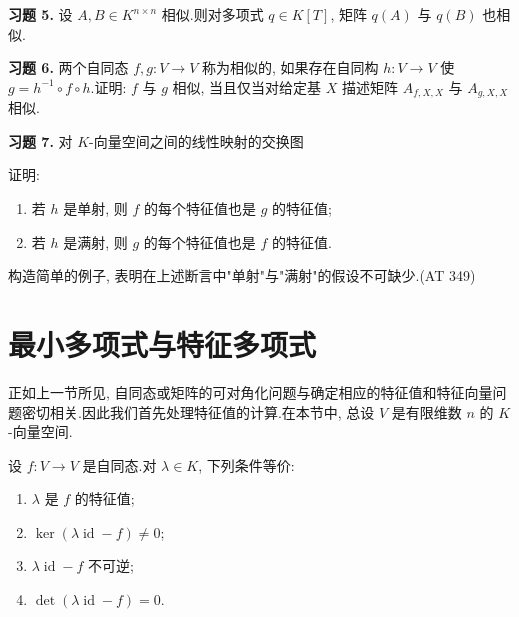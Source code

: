 \medskip
\noindent\textbf{习题 5.} 设 $A, B \in K^{n \times n}$ 相似.则对多项式 $q \in K[T]$, 矩阵 $q(A)$ 与 $q(B)$ 也相似.

\medskip
\noindent\textbf{习题 6.} 两个自同态 $f, g \colon V \longrightarrow V$ 称为相似的, 如果存在自同构 $h \colon V \longrightarrow V$ 使 $g = h^{-1} \circ f \circ h$.证明: $f$ 与 $g$ 相似, 当且仅当对给定基 $X$ 描述矩阵 $A_{f, X, X}$ 与 $A_{g, X, X}$ 相似.

\medskip
\noindent\textbf{习题 7.} 对 $K$-向量空间之间的线性映射的交换图

\begin{center}
\end{center}

证明:
\begin{enumerate}
\item[(i)] 若 $h$ 是单射, 则 $f$ 的每个特征值也是 $g$ 的特征值;
\item[(ii)] 若 $h$ 是满射, 则 $g$ 的每个特征值也是 $f$ 的特征值.
\end{enumerate}

构造简单的例子, 表明在上述断言中"单射"与"满射"的假设不可缺少.(AT 349)

\section{最小多项式与特征多项式}\label{sec:6.2}

正如上一节所见, 自同态或矩阵的可对角化问题与确定相应的特征值和特征向量问题密切相关.因此我们首先处理特征值的计算.在本节中, 总设 $V$ 是有限维数 $n$ 的 $K$-向量空间.

\begin{theorem}\label{thm:6.2.1}
设 $f \colon V \longrightarrow V$ 是自同态.对 $\lambda \in K$, 下列条件等价:
\begin{enumerate}
\item[(i)] $\lambda$ 是 $f$ 的特征值;
\item[(ii)] $\ker(\lambda \operatorname{id} - f) \neq 0$;
\item[(iii)] $\lambda \operatorname{id} - f$ 不可逆;
\item[(iv)] $\det(\lambda \operatorname{id} - f) = 0$.
\end{enumerate}
\end{theorem}

